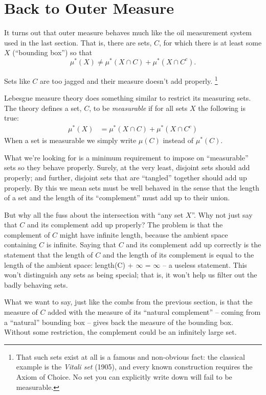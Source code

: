\documentclass{article}
\begin{document}
\section{Back to Outer Measure}
It turns out that outer measure behaves much like the oil measurement system
used in the last section. That is, there are sets, $C$, for which there is at
least some $X$ (``bounding box'') so that
$$
\mu^*(X) \neq \mu^*(X \cap C) + \mu^*(X \cap C^c).
$$

Sets like $C$ are too jagged and their measure doesn't add properly.%
\footnote{That such sets exist at all is a famous and non-obvious fact: the
classical example is the {\em Vitali set\/} (1905), and every known
construction requires the Axiom of Choice.  No set you can explicitly write
down will fail to be measurable.}

Lebesgue measure theory does something similar to restrict its measuring sets.
The theory defines a set, $C$, to be {\em measurable\/}
if for all sets $X$ the following is true:
\begin{align}
	\mu^*(X) &= \mu^*(X \cap C) + \mu^*(X \cap C^c) \label{caratheodory}
\end{align}
When a set is measurable we simply write $\mu(C)$ instead of $\mu^*(C)$.

What we're looking for is a minimum requirement to impose on ``measurable'' sets
so they behave properly. Surely, at the very least, disjoint sets
should add properly; and further, disjoint sets that are ``tangled'' together
should add up properly.
By this we mean sets must be well behaved
in the sense that the length of a set and the length of its ``complement'' 
must add up to their union. 

But why all the fuss about the intersection with ``any set $X$''.
Why not just say that $C$ and its complement add up properly?
The problem is that the complement of $C$ might have infinite length, because
the ambient space containing $C$ is infinite.
Saying that $C$ and its complement add up correctly is the statement that 
the length of $C$ and the length of its complement is equal to the length 
of the ambient space: length(C) + $\infty$ = $\infty$ -- a useless statement.
This won't distinguish any sets as being special; that is, it won't help
us filter out the badly behaving sets.

What we want to say, just like the combs from the
previous section, is that the measure of $C$ added with the measure of its 
``natural complement'' -- coming from a ``natural'' bounding box -- 
gives back the measure of the bounding box.
Without some restriction, the complement could be 
an infinitely large set.
\end{document}
